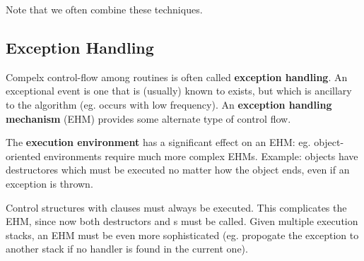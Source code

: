 \documentclass[12pt]{article}
\begin{document}
Note that we often combine these techniques.

\subsection{Exception Handling}
Compelx control-flow among routines is often called {\bf exception handling}. An exceptional event is one that is (usually) known to exists, but which is ancillary to the algorithm (eg. occurs with low frequency). An {\bf exception handling mechanism} (EHM) provides some alternate type of control flow.

The {\bf execution environment} has a significant effect on an EHM: eg. object-oriented environments require much more complex EHMs. Example: objects have destructores which must be executed no matter how the object ends, even if an exception is thrown.

Control structures with  clauses must always be executed. This complicates the EHM, since now both destructors and s must be called. Given multiple execution stacks, an EHM must be even more sophisticated (eg. propogate the exception to another stack if no handler is found in the current one).
\end{document}
